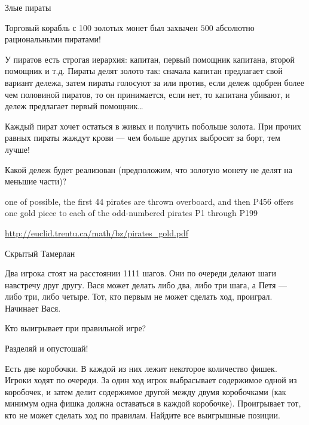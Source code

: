\begin{problem}
 Злые пираты \par
Торговый корабль с 100 золотых монет был захвачен $500$ абсолютно рациональными пиратами!  \par
У пиратов есть строгая иерархия: капитан, первый помощник капитана, второй помощник и т.д. Пираты делят золото так: сначала капитан предлагает свой вариант дележа, затем пираты голосуют за или против, если дележ одобрен более чем половиной пиратов, то он принимается, если нет, то капитана убивают, и дележ предлагает первый помощник\ldots \par
Каждый пират хочет остаться в живых и получить побольше золота. При прочих равных пираты жаждут крови — чем больше других выбросят за борт, тем лучше! \par
Какой дележ будет реализован (предположим, что золотую монету не делят на меньшие части)?



\begin{sol}

 one of possible, the first 44 pirates are thrown overboard, and then P456 offers
 one gold piece to each of the odd-numbered pirates P1 through P199
\end{sol}
\end{problem}


\begin{source}
 \url{http://euclid.trentu.ca/math/bz/pirates_gold.pdf}
\end{source}



\begin{problem}
 Скрытый Тамерлан\par
Два игрока стоят на расстоянии 1111 шагов. Они по очереди делают шаги навстречу друг другу. Вася может делать либо два, либо три шага, а Петя — либо три, либо четыре. Тот, кто первым не может сделать ход, проиграл. Начинает Вася.\par
Кто выигрывает при правильной игре?\par



\begin{sol}

\end{sol}
\end{problem}



\begin{problem}
 Разделяй и опустошай!\par
Есть две коробочки. В каждой из них лежит некоторое количество фишек. Игроки ходят по очереди. За один ход игрок выбрасывает содержимое одной из коробочек, и затем делит содержимое другой между двумя коробочками (как минимум одна фишка должна оставаться в каждой коробочке). Проигрывает тот, кто не может сделать ход по правилам. Найдите все выигрышные позиции.\par



\begin{sol}

\end{sol}
\end{problem}



